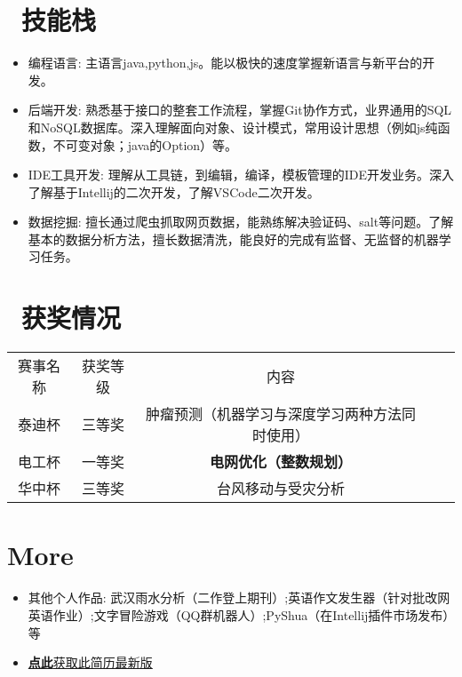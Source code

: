 \documentclass{resume}
\begin{document}
\section{\faCogs\ 技能栈}
\begin{itemize}[parsep=0.5ex]
  \item 编程语言: 主语言java,python,js。能以极快的速度掌握新语言与新平台的开发。
  \item 后端开发: 熟悉基于接口的整套工作流程，掌握Git协作方式，业界通用的SQL和NoSQL数据库。深入理解面向对象、设计模式，常用设计思想（例如js纯函数，不可变对象；java的Option）等。
  \item IDE工具开发: 理解从工具链，到编辑，编译，模板管理的IDE开发业务。深入了解基于Intellij的二次开发，了解VSCode二次开发。
  \item 数据挖掘:
  擅长通过爬虫抓取网页数据，能熟练解决验证码、salt等问题。了解基本的数据分析方法，擅长数据清洗，能良好的完成有监督、无监督的机器学习任务。
\end{itemize}

\section{\faHeartO\ 获奖情况}

\begin{tabular}{cccll}
赛事名称 & 获奖等级 & 内容                      &  &  \\
泰迪杯  & 三等奖  & 肿瘤预测（机器学习与深度学习两种方法同时使用） &  &  \\
电工杯  & 一等奖  & \textbf{电网优化（整数规划）}     &  &  \\
华中杯  & 三等奖  & 台风移动与受灾分析               &  & 
\end{tabular}


\section{More}
\begin{itemize}[parsep=0.5ex]
  \item 其他个人作品: 武汉雨水分析（二作登上期刊）;英语作文发生器（针对批改网英语作业）;文字冒险游戏（QQ群机器人）;PyShua（在Intellij插件市场发布）等
  \item \href{https://github.com/ZGarry/resume}{\textbf{点此}获取此简历最新版}
\end{itemize}

%
%
\end{document}
